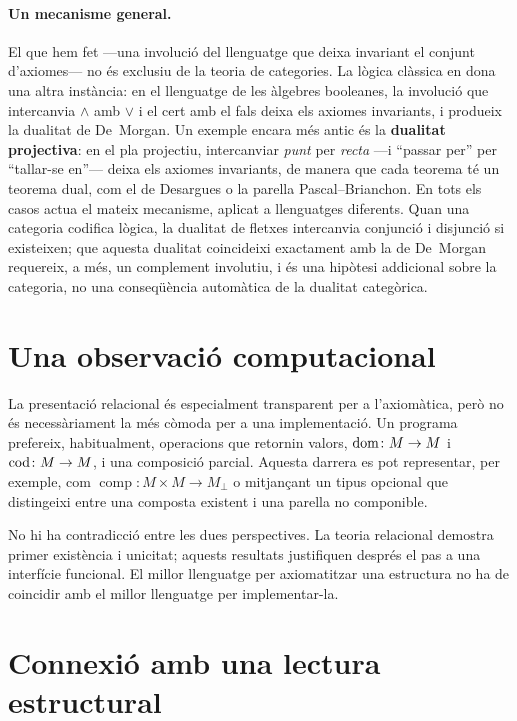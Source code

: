 \paragraph{Un mecanisme general.}
El que hem fet ---una involució del llenguatge que deixa invariant el conjunt d'axiomes--- no és exclusiu de la teoria de categories. La lògica clàssica en dona una altra instància: en el llenguatge de les àlgebres booleanes, la involució que intercanvia $\wedge$ amb $\vee$ i el cert amb el fals deixa els axiomes invariants, i produeix la dualitat de De~Morgan. Un exemple encara més antic és la \textbf{dualitat projectiva}: en el pla projectiu, intercanviar \emph{punt} per \emph{recta} ---i \enquote{passar per} per \enquote{tallar-se en}--- deixa els axiomes invariants, de manera que cada teorema té un teorema dual, com el de Desargues o la parella Pascal--Brianchon. En tots els casos actua el mateix mecanisme, aplicat a llenguatges diferents. Quan una categoria codifica lògica, la dualitat de fletxes intercanvia conjunció i disjunció si existeixen; que aquesta dualitat coincideixi exactament amb la de De~Morgan requereix, a més, un complement involutiu, i és una hipòtesi addicional sobre la categoria, no una conseqüència automàtica de la dualitat categòrica.

\section{Una observació computacional}
\label{sec:ar-computacional}

La presentació relacional és especialment transparent per a l'axiomàtica, però no és necessàriament la més còmoda per a una implementació. Un programa prefereix, habitualment, operacions que retornin valors, $\operatorname{dom}\colon M\to M$ i $\operatorname{cod}\colon M\to M$, i una composició parcial. Aquesta darrera es pot representar, per exemple, com $\operatorname{comp}\colon M\times M\longrightarrow M_{\bot}$ o mitjançant un tipus opcional que distingeixi entre una composta existent i una parella no componible.

No hi ha contradicció entre les dues perspectives. La teoria relacional demostra primer existència i unicitat; aquests resultats justifiquen després el pas a una interfície funcional. El millor llenguatge per axiomatitzar una estructura no ha de coincidir amb el millor llenguatge per implementar-la.

\section{Connexió amb una lectura estructural}
\label{sec:ar-estructural}

